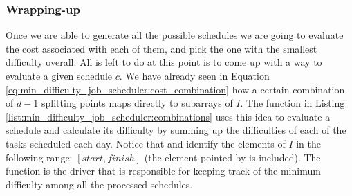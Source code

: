 


\subsubsection{Wrapping-up}
Once we are able to generate all the possible schedules we are going to evaluate the cost associated
with each of them, and pick the one with the smallest difficulty overall. All is left to do at this
point is to come up with a way to evaluate a given schedule $c$. We have already seen in Equation
\ref{eq:min_difficulty_job_scheduler:cost_combination} how a certain combination of $d-1$ splitting
points maps directly to subarrays of $I$. The function  in Listing
\ref{list:min_difficulty_job_scheduler:combinations} uses this idea to evaluate a schedule and
calculate its difficulty by summing up the difficulties of each of the tasks scheduled each day.
Notice that  and  identify the elements of $I$ in the following range:
$[start, finish]$ (the element pointed by  is included). The function
 is the driver that is responsible for keeping
track of the minimum difficulty among all the processed schedules.




